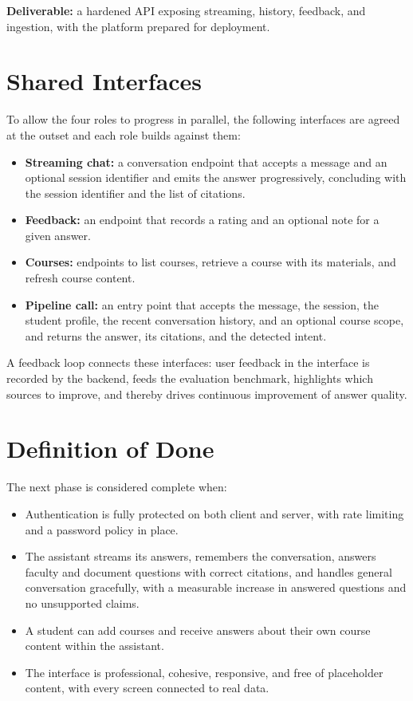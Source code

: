 \documentclass[11pt,a4paper]{article}
\begin{document}
\textbf{Deliverable:} a hardened API exposing streaming, history, feedback, and
ingestion, with the platform prepared for deployment.

\section{Shared Interfaces}

To allow the four roles to progress in parallel, the following interfaces are agreed
at the outset and each role builds against them:

\begin{itemize}
  \item \textbf{Streaming chat:} a conversation endpoint that accepts a message and an
        optional session identifier and emits the answer progressively, concluding with
        the session identifier and the list of citations.
  \item \textbf{Feedback:} an endpoint that records a rating and an optional note for a
        given answer.
  \item \textbf{Courses:} endpoints to list courses, retrieve a course with its
        materials, and refresh course content.
  \item \textbf{Pipeline call:} an entry point that accepts the message, the session,
        the student profile, the recent conversation history, and an optional course
        scope, and returns the answer, its citations, and the detected intent.
\end{itemize}

A feedback loop connects these interfaces: user feedback in the interface is recorded
by the backend, feeds the evaluation benchmark, highlights which sources to improve,
and thereby drives continuous improvement of answer quality.

\section{Definition of Done}

The next phase is considered complete when:

\begin{itemize}
  \item Authentication is fully protected on both client and server, with rate limiting
        and a password policy in place.
  \item The assistant streams its answers, remembers the conversation, answers faculty
        and document questions with correct citations, and handles general
        conversation gracefully, with a measurable increase in answered questions and
        no unsupported claims.
  \item A student can add courses and receive answers about their own course content
        within the assistant.
  \item The interface is professional, cohesive, responsive, and free of placeholder
        content, with every screen connected to real data.
\end{itemize}
\end{document}
